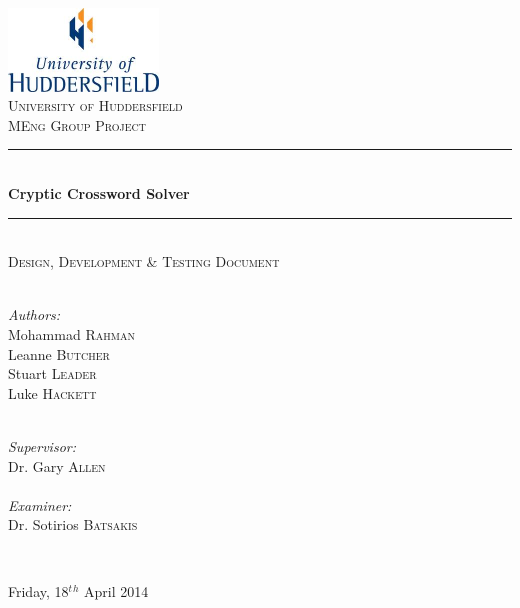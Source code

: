 \newcommand{\HRule}{\rule{\linewidth}{0.5mm}}

\begin{titlepage}
  \begin{center}

  \includegraphics[width=0.3\textwidth]{../UoHLogo.jpg} \\[2.5cm]

  \textsc{\LARGE University of Huddersfield} \\[1.5cm]

  \textsc{\Large MEng Group Project} \\[0.75cm]

  \HRule \\[0.4cm]
    { \huge \bfseries Cryptic Crossword Solver }
  \\[0.1cm]

  \HRule \\[0.75cm]

  \textsc{\Large Design, Development \& Testing Document} \\[2cm]

  \begin{minipage}{0.4\textwidth}
    \begin{flushleft} \large ~\\
      \emph{Authors:}\\
      Mohammad \textsc{Rahman} \\
      Leanne \textsc{Butcher} \\
      Stuart \textsc{Leader} \\
      Luke \textsc{Hackett} 
    \end{flushleft}
  \end{minipage}
  \begin{minipage}{0.4\textwidth}
    \begin{flushright} \large ~\\
      \emph{Supervisor:} \\ 
      Dr. Gary \textsc{Allen}
      ~\\ ~\\
      \emph{Examiner:} \\
      Dr. Sotirios \textsc{Batsakis} 
    \end{flushright}
  \end{minipage}

  ~\\[0.01cm]


  \vfill

  {\large Friday, 18$^t$$^h$ April 2014}

  \end{center}
\end{titlepage}
